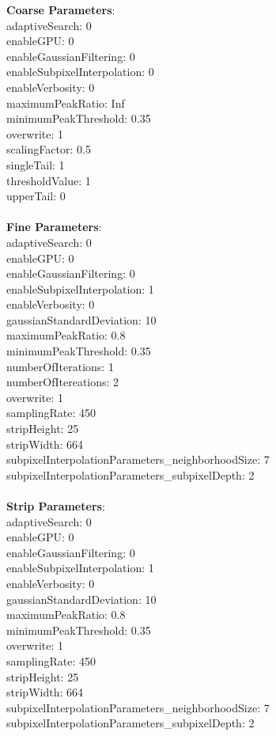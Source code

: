 \documentclass[11pt]{article}
\begin{document}
\textbf{Coarse Parameters}: \\
adaptiveSearch: 0\\
enableGPU: 0\\
enableGaussianFiltering: 0\\
enableSubpixelInterpolation: 0\\
enableVerbosity: 0\\
maximumPeakRatio: Inf\\
minimumPeakThreshold: 0.35\\
overwrite: 1\\
scalingFactor: 0.5\\
singleTail: 1\\
thresholdValue: 1\\
upperTail: 0\\
\\
\textbf{Fine Parameters}: \\
adaptiveSearch: 0\\
enableGPU: 0\\
enableGaussianFiltering: 0\\
enableSubpixelInterpolation: 1\\
enableVerbosity: 0\\
gaussianStandardDeviation: 10\\
maximumPeakRatio: 0.8\\
minimumPeakThreshold: 0.35\\
numberOfIterations: 1\\
numberOfItereations: 2\\
overwrite: 1\\
samplingRate: 450\\
stripHeight: 25\\
stripWidth: 664\\
subpixelInterpolationParameters\_neighborhoodSize: 7\\
subpixelInterpolationParameters\_subpixelDepth: 2\\
\\
\textbf{Strip Parameters}: \\
adaptiveSearch: 0\\
enableGPU: 0\\
enableGaussianFiltering: 0\\
enableSubpixelInterpolation: 1\\
enableVerbosity: 0\\
gaussianStandardDeviation: 10\\
maximumPeakRatio: 0.8\\
minimumPeakThreshold: 0.35\\
overwrite: 1\\
samplingRate: 450\\
stripHeight: 25\\
stripWidth: 664\\
subpixelInterpolationParameters\_neighborhoodSize: 7\\
subpixelInterpolationParameters\_subpixelDepth: 2\\
\\
\newpage
\end{document}
